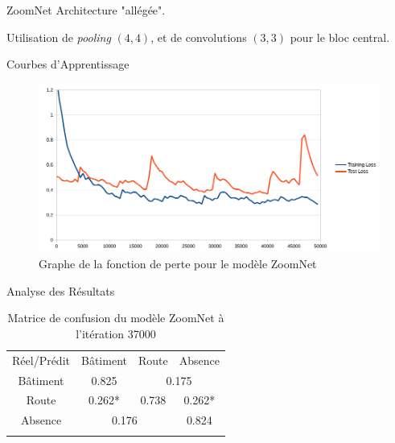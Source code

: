 \documentclass[11pt]{beamer}
\begin{document}
\begin{frame}{ZoomNet}
Architecture "allégée".

Utilisation de \emph{pooling} $(4, 4)$, et de convolutions $(3, 3)$ pour le bloc central.
\end{frame}
\begin{frame}{Courbes d'Apprentissage}
	\begin{figure}[H]
		\centering
		\includegraphics[scale=0.45]{Images/Losses_ZoomNet.png}
		\caption{Graphe de la fonction de perte pour le modèle ZoomNet}
	\end{figure}
\end{frame}
\begin{frame}{Analyse des Résultats}
	\begin{table}[H]
		\centering
		\begin{tabularx}{0.5\textwidth}{c|c c c|}
			Réel/Prédit & Bâtiment & Route & Absence \\
			\hhline{----}
			Bâtiment & 0.825 \cellcolor[gray]{.8} & \multicolumn{2}{c|}{0.175} \\
			Route & 0.262* & 0.738 \cellcolor[gray]{.8} & 0.262*\\
			Absence & \multicolumn{2}{c}{0.176} & 0.824 \cellcolor[gray]{.8}\\
			\hhline{~---}
		\end{tabularx}
		\caption{Matrice de confusion du modèle ZoomNet à l'itération 37000}
	\end{table}
\end{frame}
\end{document}
